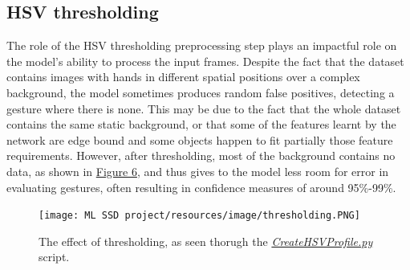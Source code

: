\documentclass[10pt,twocolumn,letterpaper]{article}
\begin{document}
\subsection{HSV thresholding}
\begin{flushleft}
The role of the HSV thresholding preprocessing step plays an impactful role on the model's ability to process the input frames. Despite the fact that the dataset contains images with hands in different spatial positions over a complex background, the model sometimes produces random false positives, detecting a gesture where there is none. This may be due to the fact that the whole dataset contains the same static background, or that some of the features learnt by the network are edge bound and some objects happen to fit partially those feature requirements. However, after thresholding, most of the background contains no data, as shown in \hyperref[figure6]{Figure 6}, and thus gives to the model less room for error in evaluating gestures, often resulting in confidence measures of around 95\%-99\%.

\begin{figure}[!h]
    \centering
    \texttt{[image: ML SSD project/resources/image/thresholding.PNG]}
    \caption{The effect of thresholding, as seen thorugh the \textit{\href{https://github.com/MarzioVallero/ML-Based-Blender-Gestural-Input-Interface/blob/master/CreateHSVProfile.py}{CreateHSVProfile.py}} script.}
\end{figure}
\label{figure6}

\end{flushleft}
\end{document}
